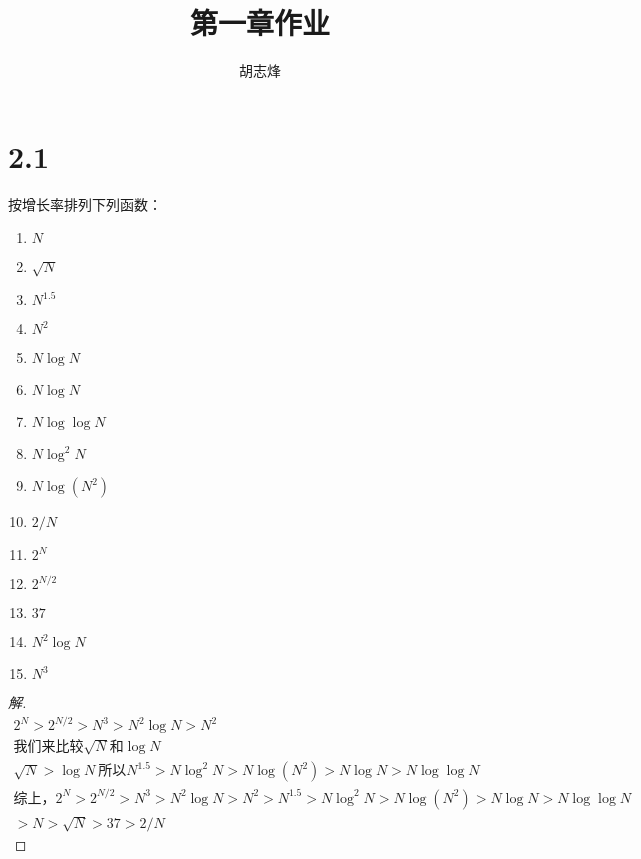 \documentclass[utf8]{ctexart}
\author{胡志烽}
\title{第一章作业}
\begin{document}
\maketitle
\section*{2.1}
按增长率排列下列函数：
\begin{enumerate}
    \item $N$ \item $\sqrt N$ \item $N^{1.5}$ \item $N^2$ \item $N\log N$ \item $N \log N$ \item $N\log \log N$ \item $N \log ^2 N$ \item $N\log (N^2)$ \item $2/N$ 
    \item $2^N$
    \item $2^{N/2}$ 
    \item $37$
    \item $N^2 \log N$
    \item $N^3$
\end{enumerate}

\begin{proof}[解]
    \begin{gather*}
        2^ N > 2^{N/2}>N^3 > N^2 \log N > N ^2 \\
        我们来比较\sqrt N 和\log N  \\ 
        \sqrt N > \log N\ 
        所以N^{1.5}>N\log ^2 N>N\log (N^2) >N\log N >N\log \log N\\
        综上，2^ N > 2^{N/2}>N^3 > N^2 \log N > N ^2 > N^{1.5} >N\log ^2 N>N\log (N^2) >N\log N >N\log \log N\\
        >N>\sqrt N >37 >2/N
    \end{gather*}
\end{proof}
\end{document}
